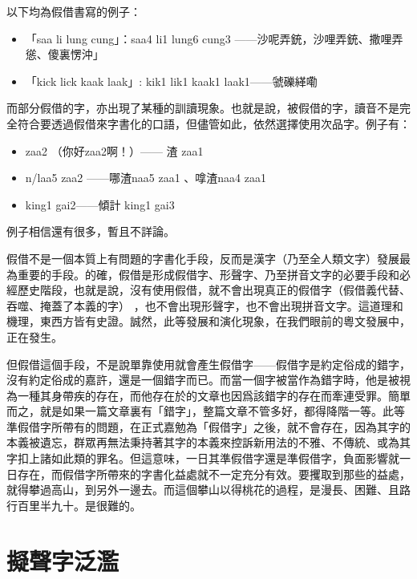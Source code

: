 \documentclass[a5paper, 12pt, openany]{book} %
\begin{document}
以下均為假借書寫的例子：

\begin{itemize}
\item 「saa li lung cung」：saa4 li1 lung6 cung3 ——沙呢弄銃，沙哩弄銃、撒哩弄慫、傻裏愣沖」
\item 「kick lick kaak laak」: kik1 lik1 kaak1 laak1——虢礫緙嘞  
\end{itemize}

而部分假借的字，亦出現了某種的訓讀現象。也就是說，被假借的字，讀音不是完全符合要透過假借來字書化的口語，但儘管如此，依然選擇使用次品字。例子有：

\begin{itemize}
\item zaa2 （你好zaa2啊！）—— 渣 zaa1
\item n/laa5 zaa2 ——哪渣naa5 zaa1 、嗱渣naa4 zaa1 
\item king1 gai2——傾計 king1 gai3
\end{itemize}

例子相信還有很多，暫且不詳論。

假借不是一個本質上有問題的字書化手段，反而是漢字（乃至全人類文字）發展最為重要的手段。的確，假借是形成假借字、形聲字、乃至拼音文字的必要手段和必經歷史階段，也就是說，沒有使用假借，就不會出現真正的假借字（假借義代替、吞噬、掩蓋了本義的字） ，也不會出現形聲字，也不會出現拼音文字。這道理和機理，東西方皆有史證。誠然，此等發展和演化現象，在我們眼前的粵文發展中，正在發生。

但假借這個手段，不是說單靠使用就會產生假借字——假借字是約定俗成的錯字，沒有約定俗成的嘉許，還是一個錯字而已。而當一個字被當作為錯字時，他是被視為一種其身帶疾的存在，而他存在於的文章也因爲該錯字的存在而牽連受罪。簡單而之，就是如果一篇文章裏有「錯字」，整篇文章不管多好，都得降階一等。此等準假借字所帶有的問題，在正式嘉勉為「假借字」之後，就不會存在，因為其字的本義被遺忘，群眾再無法秉持著其字的本義來控訴新用法的不雅、不傳統、或為其字扣上諸如此類的罪名。但這意味，一日其準假借字還是準假借字，負面影響就一日存在，而假借字所帶來的字書化益處就不一定充分有效。要攫取到那些的益處，就得攀過高山，到另外一邊去。而這個攀山以得桃花的過程，是漫長、困難、且路行百里半九十。是很難的。
\section{擬聲字泛濫}
\end{document}
